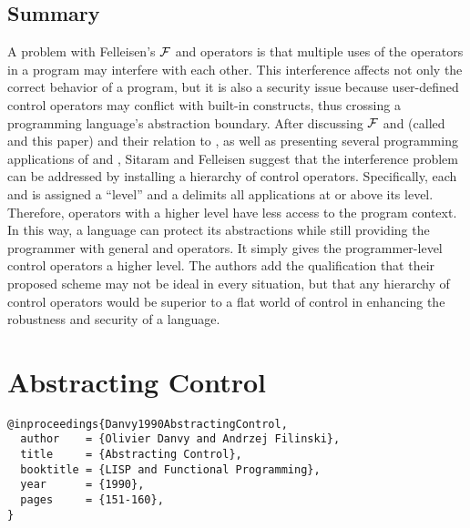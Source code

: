\documentclass[letterpaper]{llncs}
\begin{document}
\subsection*{Summary}
A problem with Felleisen's $ \mathcal{F} $ and \prompt operators is that multiple uses of the operators in a program may interfere with each other. This interference affects not only the correct behavior of a program, but it is also a security issue because user-defined control operators may conflict with built-in constructs, thus crossing a programming language's abstraction boundary. After discussing $ \mathcal{F} $ and \prompt (called \ctrl and \run this paper) and their relation to \callcc, as well as presenting several programming applications of \ctrl and \run, Sitaram and Felleisen suggest that the interference problem can be addressed by installing a hierarchy of control operators. Specifically, each \ctrl and \run is assigned a ``level'' and a \run delimits all \ctrl applications at or above its level. Therefore, operators with a higher level have less access to the program context. In this way, a language can protect its abstractions while still providing the programmer with general \ctrl and \run operators. It simply gives the programmer-level control operators a higher level. The authors add the qualification that their proposed scheme may not be ideal in every situation, but that any hierarchy of control operators would be superior to a flat world of control in enhancing the robustness and security of a language.


\section*{Abstracting Control}%

\begin{verbatim}
@inproceedings{Danvy1990AbstractingControl,
  author    = {Olivier Danvy and Andrzej Filinski},
  title     = {Abstracting Control},
  booktitle = {LISP and Functional Programming},
  year      = {1990},
  pages     = {151-160},
}
\end{verbatim}
\end{document}
